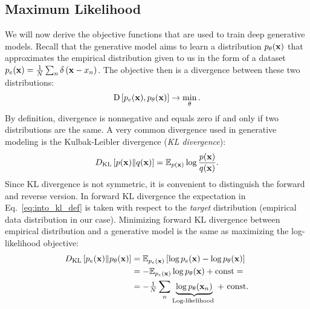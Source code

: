 \subsection{Maximum Likelihood}
We will now derive the objective functions that are used to train deep generative models. 
Recall that the generative model aims to learn a distribution $p_{\theta}({\mathbf{x}})$ that approximates the empirical distribution given to us in the form of a dataset $p_e({\mathbf{x}}) = \frac1N \sum_n \delta\left({\mathbf{x}} - x_n\right)$. 
The objective then is a divergence between these two distributions:
\begin{equation}\label{eq:intro_divergence}
\begin{aligned}
\text{D}\left[p_{e}(\rvx), p_{\theta}(\rvx)\right] \rightarrow \min_{\theta}.
\end{aligned}
\end{equation} 
By definition, divergence is nonnegative and equals zero if and only if two distributions are the same. 
A very common divergence used in generative modeling is the Kulbak-Leibler divergence (\textit{KL divergence}):
\begin{equation}
\begin{aligned} \label{eq:into_kl_def}
 \KL{p(\rvx)}{q(\rvx)} = \E_{p(\rvx)} \log \frac{p(\rvx)}{q(\rvx)}.
\end{aligned}
\end{equation}
\newline
Since KL divergence is not symmetric, it is convenient to distinguish the forward and reverse version. In forward KL divergence the expectation in Eq.~\ref{eq:into_kl_def} is taken with respect to the \textit{target} distribution (empirical data distribution in our case). Minimizing forward KL divergence between empirical distribution and a generative model is the same as maximizing the log-likelihood objective:
\begin{equation}
\begin{aligned}
D_{\mathrm{KL}}\left[p_{e}({\mathbf{x}})\|p_{\theta}({\mathbf{x}})\right] & =  \mathbb{E}_{p_{e}({\mathbf{x}})}\left[ \log p_{e}({\mathbf{x}}) - \log p_{\theta}({\mathbf{x}})\right] \\
& =  - \mathbb{E}_{p_{e}({\mathbf{x}})} \log p_{\theta}({\mathbf{x}}) + \text{const}=\\
& =  - \tfrac1N \sum_n \underbrace{\log p_{\theta}({\mathbf{x}}_n)}_{\text{Log-likelihood }}  + \text{ const}.
\end{aligned}
\end{equation}
